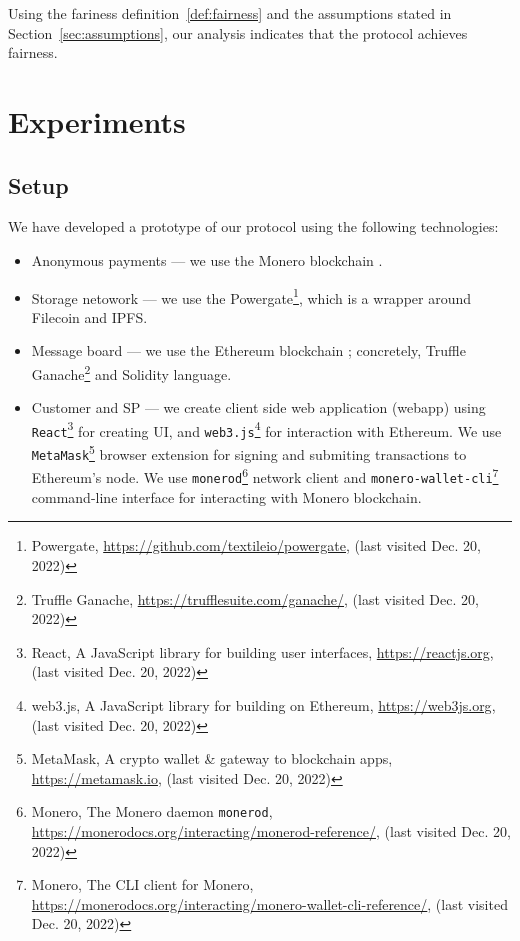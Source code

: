 \documentclass{ieeeaccess}
\begin{document}
Using the fariness definition~\ref{def:fairness} and the assumptions stated in Section~\ref{sec:assumptions}, our analysis indicates that the protocol achieves fairness.

\section{Experiments}\label{sec:experiments}

\subsection*{Setup}

We have developed a prototype of our protocol using the following technologies:

\begin{itemize}
  \item{Anonymous payments} — we use the Monero blockchain \cite{noetherRingSignatureConfidential2015}.
  \item{Storage netowork} — we use the Powergate\footnote{Powergate, \url{https://github.com/textileio/powergate}, (last visited Dec. 20, 2022)}, which is a wrapper around Filecoin and IPFS.
  \item{Message board} — we use the Ethereum blockchain \cite{woodEthereumSecureDecentralised2014}; concretely, Truffle Ganache\footnote{Truffle Ganache, \url{https://trufflesuite.com/ganache/}, (last visited Dec. 20, 2022)} and Solidity language.
  \item{Customer and SP} — we create client side web application (webapp) using \texttt{React}\footnote{React, A JavaScript library for building user interfaces, \url{https://reactjs.org}, (last visited Dec. 20, 2022)} for creating UI, and \texttt{web3.js}\footnote{web3.js, A JavaScript library for building on Ethereum, \url{https://web3js.org}, (last visited Dec. 20, 2022)} for interaction with Ethereum. We use \texttt{MetaMask}\footnote{MetaMask, A crypto wallet \& gateway to blockchain apps, \url{https://metamask.io}, (last visited Dec. 20, 2022)} browser extension for signing and submiting transactions to Ethereum's node. We use \texttt{monerod}\footnote{Monero, The Monero daemon \texttt{monerod}, \url{https://monerodocs.org/interacting/monerod-reference/}, (last visited Dec. 20, 2022)} network client and \texttt{monero-wallet-cli}\footnote{Monero, The CLI client for Monero, \url{https://monerodocs.org/interacting/monero-wallet-cli-reference/}, (last visited Dec. 20, 2022)} command-line interface for interacting with Monero blockchain.
\end{itemize}
\end{document}
